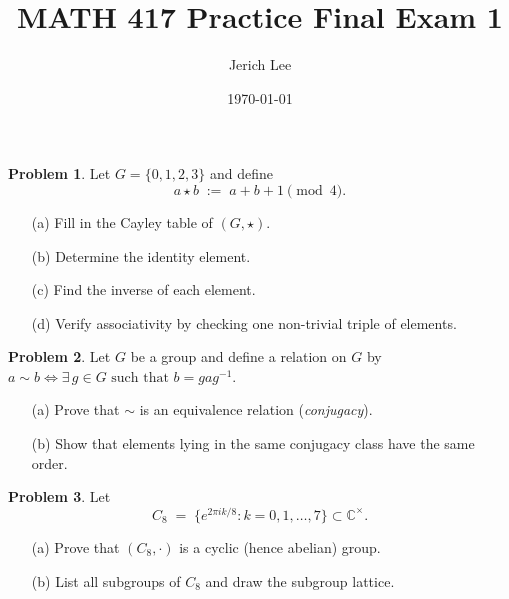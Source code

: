 \documentclass[12pt]{article}
\title{MATH 417 Practice Final Exam 1}
\author{Jerich Lee}
\date{\today}
\theoremstyle{definition} %
\newtheorem{problem}{Problem}
\theoremstyle{plain} %
\begin{document}
\maketitle
\newcommand{\Z}{\mathbb Z}
\newcommand{\Q}{\mathbb Q}
\newcommand{\R}{\mathbb R}

\bigskip
\begin{problem}
  Let \(G=\{0,1,2,3\}\) and define
  \[
      a\star b \;:=\; a+b+1\pmod{4}.
  \]
  \begin{enumerate}
      \item[(a)] Fill in the Cayley table of \((G,\star)\).
      \item[(b)] Determine the identity element.
      \item[(c)] Find the inverse of each element.
      \item[(d)] Verify associativity by checking one non-trivial triple of elements.
  \end{enumerate}
\end{problem}

\bigskip
\begin{problem}
  Let \(G\) be a group and define a relation on \(G\) by
  \(a\sim b \iff \exists\,g\in G\text{ such that }b=gag^{-1}\).
  \begin{enumerate}
      \item[(a)] Prove that \(\sim\) is an equivalence relation
                (\emph{conjugacy}).
      \item[(b)] Show that elements lying in the same conjugacy class
                have the same order.
  \end{enumerate}
\end{problem}

\bigskip
\begin{problem}
  Let
  \[
      C_{8}\;=\;\bigl\{e^{2\pi i k/8}:k=0,1,\dots,7\bigr\}
      \subset \mathbb{C}^{\times}.
  \]
  \begin{enumerate}
      \item[(a)] Prove that \((C_{8},\cdot)\) is a cyclic (hence abelian) group.
      \item[(b)] List all subgroups of \(C_{8}\) and draw the subgroup lattice.
  \end{enumerate}
\end{problem}
\end{document}
